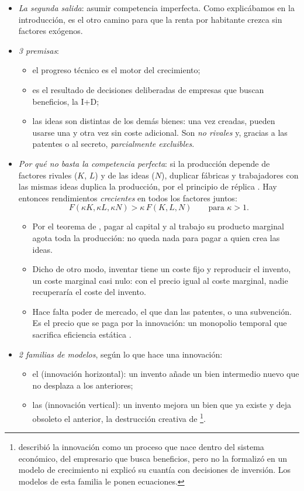 \documentclass[11pt]{article}
\begin{document}
\begin{itemize}
\item \emph{La segunda salida}: asumir competencia imperfecta. Como explicábamos en la introducción, es el otro camino para que la renta por habitante crezca sin factores exógenos.
\item \emph{3 premisas}\nocite{Romer1990}:
  \begin{itemize}
  \item el progreso técnico es el motor del crecimiento;
  \item es el resultado de decisiones deliberadas de empresas que buscan beneficios, la I+D;
  \item las ideas son distintas de los demás bienes: una vez creadas, pueden usarse una y otra vez sin coste adicional. Son \emph{no rivales} y, gracias a las patentes o al secreto, \emph{parcialmente excluibles}.
  \end{itemize}
\item \emph{Por qué no basta la competencia perfecta}: si la producción depende de factores rivales ($K$, $L$) y de las ideas ($N$), duplicar fábricas y trabajadores con las mismas ideas duplica la producción, por el principio de réplica . Hay entonces rendimientos \emph{crecientes} en todos los factores juntos:
  \[F(\kappa K,\kappa L,\kappa N)>\kappa\,F(K,L,N)\qquad\text{para }\kappa>1.\]
  \begin{itemize}
  \item Por el teorema de , pagar al capital y al trabajo su producto marginal agota toda la producción: no queda nada para pagar a quien crea las ideas.
  \item Dicho de otro modo, inventar tiene un coste fijo y reproducir el invento, un coste marginal casi nulo: con el precio igual al coste marginal, nadie recuperaría el coste del invento.
  \item Hace falta poder de mercado, el que dan las patentes, o una subvención. Es el precio que se paga por la innovación: un monopolio temporal que sacrifica eficiencia estática\nocite{Arrow1962Economic} .
  \end{itemize}
\item \emph{2 familias de modelos}, según lo que hace una innovación:
  \begin{itemize}
  \item el  (innovación horizontal): un invento añade un bien intermedio nuevo que no desplaza a los anteriores\nocite{Romer1990}\nocite{GrossmanHelpman1991};
  \item las  (innovación vertical): un invento mejora un bien que ya existe y deja obsoleto el anterior, la destrucción creativa de \footnote{ describió la innovación como un proceso que nace dentro del sistema económico, del empresario que busca beneficios, pero no la formalizó en un modelo de crecimiento ni explicó su cuantía con decisiones de inversión\nocite{Schumpeter1942}. Los modelos de esta familia le ponen ecuaciones.}\nocite{AghionHowitt1992,GrossmanHelpman1991Quality}.
  \end{itemize}
\end{itemize}
\end{document}
